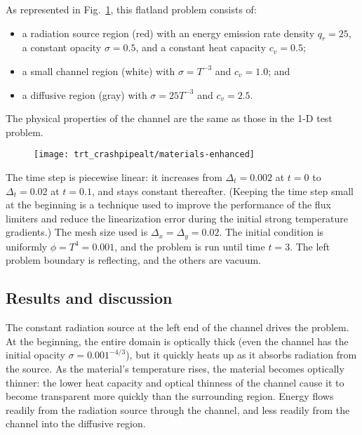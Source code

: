 As represented in Fig.~\ref{fig:crashaltMaterials}, this flatland problem
consists of:
\begin{itemize}
  \item a radiation source region (red) with an energy emission rate density
    $q_r=25$, 
    a constant opacity $\sigma=0.5$, and a constant heat capacity $c_v=0.5$;
  \item a small channel region (white) with $\sigma = T^{-3}$ and $c_v=1.0$; and
  \item a diffusive region (gray) with $\sigma = 25 T^{-3}$ and $c_v=2.5$.
\end{itemize}
The physical properties of the channel are the same as those in the 1-D test
problem.
%
\begin{figure}[htb]
  \centering
  \texttt{[image: trt\_crashpipealt/materials-enhanced]}
  \label{fig:crashaltMaterials}
\end{figure}

The time step is piecewise linear: it increases from $\Delta_t=0.002$ at $t=0$
to $\Delta_t=0.02$ at $t=0.1$, and stays constant thereafter. (Keeping the
time step small at the beginning is a technique used to improve the
performance of the flux limiters and reduce the linearization error during the
initial strong temperature gradients.) The mesh size used
is $\Delta_x=\Delta_y=0.02$. The initial condition is uniformly $\phi = T^4 = 0.001$, and
the problem is run until time $t=3$. The left problem boundary is reflecting,
and the others are vacuum.

\subsection{Results and discussion}

The constant radiation source at the left end of the channel
drives the problem. At the beginning, the entire domain is optically thick
(even the channel has the initial opacity $\sigma=0.001^{-4/3}$), but it quickly
heats up as it absorbs radiation from the source. As the material's
temperature rises, the material becomes optically
thinner: the lower heat capacity and optical thinness of the channel cause it to
become transparent more quickly than the surrounding region. Energy flows
readily from the radiation source through the channel, and less readily from the
channel into the diffusive region.

